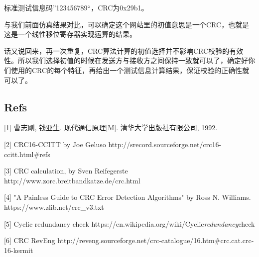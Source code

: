 \documentclass[
]{article}
\begin{document}
标准测试信息码''123456789``，CRC为0x29b1。

与我们前面仿真结果对比，可以确定这个网站里的初值意思是一个CRC，也就是这是一个线性移位寄存器实现运算的结果。

话又说回来，再一次重复，CRC算法计算的初值选择并不影响CRC校验的有效性。所以我们选择初值的时候在发送方与接收方之间保持一致就可以了，确定好你们使用的CRC的每个特征，再给出一个测试信息计算结果，保证校验的正确性就可以了。

\hypertarget{header-n322}{%
\subsection{Refs}\label{header-n322}}

{[}1{]} 曹志刚, 钱亚生. 现代通信原理{[}M{]}. 清华大学出版社有限公司,
1992.

{[}2{]} CRC16-CCITT by Joe Geluso
http://srecord.sourceforge.net/crc16-ccitt.html\#refs

{[}3{]} CRC calculation, by Sven Reifegerste
http://www.zorc.breitbandkatze.de/crc.html

{[}4{]} "A Painless Guide to CRC Error Detection Algorithms" by Ross N.
Williams. https://www.zlib.net/crc\_v3.txt

{[}5{]} Cyclic redundancy check
https://en.wikipedia.org/wiki/Cyclic\emph{redundancy}check

{[}6{]} CRC RevEng
http://reveng.sourceforge.net/crc-catalogue/16.htm\#crc.cat.crc-16-kermit
\end{document}
